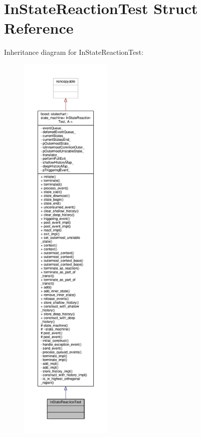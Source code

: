 \hypertarget{struct_in_state_reaction_test}{}\section{In\+State\+Reaction\+Test Struct Reference}
\label{struct_in_state_reaction_test}


Inheritance diagram for In\+State\+Reaction\+Test\+:
\nopagebreak
\begin{figure}[H]
\begin{center}
\leavevmode
\includegraphics[height=550pt]{struct_in_state_reaction_test__inherit__graph}
\end{center}
\end{figure}


